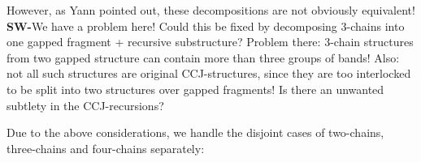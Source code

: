 \documentclass[11pt]{article} %
\newcommand{\SW}[1]{\textbf{SW-}#1}
\begin{document}
However, as Yann pointed out, these decompositions are not obviously equivalent! \SW{We have a problem here! Could this be fixed by decomposing 3-chains into one gapped fragment + recursive substructure? Problem there: 3-chain structures from two gapped structure can contain more than three groups of bands! Also: not all such structures are original CCJ-structures, since they are too interlocked to be split into two structures over gapped fragments! Is there an unwanted subtlety in the CCJ-recursions?}

Due to the above considerations, we handle the disjoint cases of two-chains, three-chains and four-chains separately:

\newcommand{\GRfragLabel}[2][]{%
  \path (i) -- node [below,#1] {#2} (l);
}

\def\tokenize#1{\ifx#1\tokenize\else#1{, }\expandafter\tokenize\fi}

\newcommand{\GRgapfragBandEater}[1]{%
  \GRgapfragCoordinates{0.8}{0.7}
  \foreach \x in {#1}{%
    \csname GRgapfragEatBand\x \endcsname[red,very thick]{}%
  }
  \GRgapfragArcs[thin]{}
  \draw[solid,thick] (i) -- (j) (k) -- (l);
  \GRfragLabel{#1}
}
  
\end{document}
